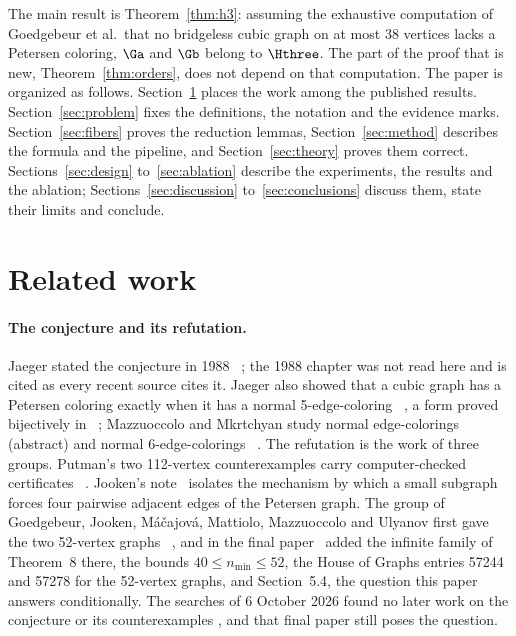 The main result is Theorem~\ref{thm:h3}: assuming the exhaustive computation of
Goedgebeur et al.\ that no bridgeless cubic graph on at most 38 vertices lacks a Petersen coloring,
$\Ga$ and $\Gb$ belong to $\Hthree$. The part of the proof that is new, Theorem~\ref{thm:orders}, does not
depend on that computation. The paper is organized as follows. Section~\ref{sec:related} places the work
among the published results. Section~\ref{sec:problem} fixes the definitions, the notation and the evidence
marks. Section~\ref{sec:fibers} proves the reduction lemmas, Section~\ref{sec:method} describes the formula
and the pipeline, and Section~\ref{sec:theory} proves them correct. Sections~\ref{sec:design} to~\ref{sec:ablation}
describe the experiments, the results and the ablation; Sections~\ref{sec:discussion} to~\ref{sec:conclusions} discuss
them, state their limits and conclude.

\section{Related work}\label{sec:related}

\paragraph{The conjecture and its refutation.} Jaeger stated the conjecture in 1988~\cite{Jaeger1988}
\evU{}; the 1988 chapter was not read here and is cited as every recent source cites it. Jaeger also showed
that a cubic graph has a Petersen coloring exactly when it has a normal 5-edge-coloring~\cite{Jaeger1985}
\evU{}, a form proved bijectively in~\cite[Proposition~2.1]{Putman2026} \evV{}; Mazzuoccolo and
Mkrtchyan study normal edge-colorings~\cite{MazzuoccoloMkrtchyan2020} \evV{} (abstract) and normal
6-edge-colorings~\cite{MazzuoccoloMkrtchyan2020b} \evU{}. The refutation is the work of three groups.
Putman's two 112-vertex counterexamples carry computer-checked certificates~\cite{Putman2026}
\evV{}. Jooken's note~\cite{Jooken2026} \evV{} isolates the mechanism by which a small subgraph forces four
pairwise adjacent edges of the Petersen graph. The group of Goedgebeur, Jooken, M\'a\v{c}ajov\'a,
Mattiolo, Mazzuoccolo and Ulyanov first gave the two 52-vertex graphs~\cite{GJMMM2026zenodo} \evV{}, and in the
final paper~\cite{GJMMMU2026} \evV{} added the infinite family of Theorem~8 there, the bounds
$40 \le n_{\min} \le 52$, the House of Graphs entries 57244 and 57278 for the 52-vertex graphs, and Section~5.4, the question this paper answers conditionally. The searches of 6 October 2026
found no later work on the conjecture or its counterexamples \evU{}, and that final paper still poses the question.

